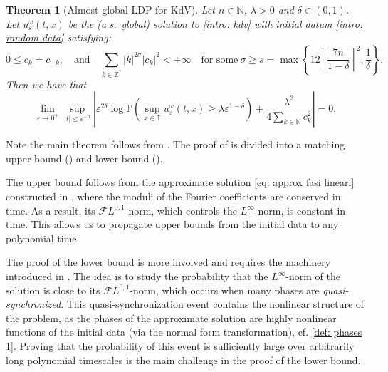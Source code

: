 \documentclass[a4paper,10pt,reqno]{article}
\theoremstyle{definition}
\theoremstyle{plain}
\newtheorem{theorem}[definition]{Theorem}
\theoremstyle{plain}
\theoremstyle{definition}
\theoremstyle{plain}
\theoremstyle{plain}
\theoremstyle{plain}
\theoremstyle{definition}
\theoremstyle{definition}
\def \N{\mathbb N}
\def \Z{\mathbb Z}
\def \P{{\mathbb P}}
\def \T{\mathbb{T}}
\def \FL{\mathcal{F}L}
\begin{document}
\begin{theorem}[Almost global LDP for KdV] \label{thm: almost global ldp intro}
Let $n \in \N$, $\lambda > 0$ and $\delta \in (0,1)$. Let $u_{\varepsilon}^{\omega}(t,x)$ be the (a.s.\ global) solution to \eqref{intro: kdv} with initial datum \eqref{intro: random data} satisfying: \begin{equation} \label{def: coeff ck}
0\leq c_k = c_{-k}, \quad \mbox{and} \quad \sum_{k \in \Z^*} |k|^{2\sigma} |c_k|^2 < + \infty \quad \mbox{for some}\  \sigma \ge s = \max \left \{  12 \left \lceil \frac{7n}{1-\delta} \right \rceil^2 , \frac{1}{\delta} \right \}.
\end{equation} 
Then we have that
\begin{equation} \label{eq: limit ldp}
\lim_{\varepsilon\to 0^{+}} \sup_{|t|\leq \varepsilon^{-n}} \left \lvert \varepsilon^{2\delta} \log \P \left( \sup_{x \in \T} u_{\varepsilon}^{\omega}(t,x) \ge \lambda \varepsilon^{1-\delta} \right) + \frac{\lambda^2}{4 \sum_{k\in\N} c_k^2} \right\rvert = 0.
\end{equation}
\end{theorem}

\medskip

Note the main theorem  follows from . The proof of  is divided into a matching upper bound () and lower bound (). 

\medskip

The upper bound follows from the approximate solution \eqref{eq: approx fasi lineari} constructed in , where the moduli of the Fourier coefficients are conserved in time. As a result, its $\FL^{0,1}$-norm, which controls the $L^{\infty}$-norm, is constant in time. This allows us to propagate upper bounds from the initial data to any polynomial time.

The proof of the lower bound is more involved and requires the machinery introduced in \cite{bertimasperograndestaffilani}. The idea is to study the probability that the $L^{\infty}$-norm of the solution is close to its $\FL^{0,1}$-norm, which occurs when many phases are \emph{quasi-synchronized}. This quasi-synchronization event contains the nonlinear structure of the problem, as the phases of the approximate solution are highly nonlinear functions of the initial data (via the normal form transformation), cf. \eqref{def: phases 1}. Proving that the probability of this event is sufficiently large over arbitrarily long polynomial timescales is the main challenge in the proof of the lower bound.
\end{document}
